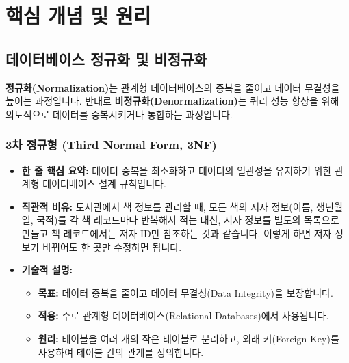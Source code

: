 \documentclass[11pt,a4paper]{article}
\begin{document}
\newpage
\section{핵심 개념 및 원리}

\subsection{데이터베이스 정규화 및 비정규화}

\begin{conceptbox}
\textbf{정규화(Normalization)}는 관계형 데이터베이스의 중복을 줄이고 데이터 무결성을 높이는 과정입니다.
반대로 \textbf{비정규화(Denormalization)}는 쿼리 성능 향상을 위해 의도적으로 데이터를 중복시키거나 통합하는 과정입니다.
\end{conceptbox}

\subsubsection{3차 정규형 (Third Normal Form, 3NF)}
\begin{itemize}
    \item \textbf{한 줄 핵심 요약:} 데이터 중복을 최소화하고 데이터의 일관성을 유지하기 위한 관계형 데이터베이스 설계 규칙입니다.
    \item \textbf{직관적 비유:} 도서관에서 책 정보를 관리할 때, 모든 책의 저자 정보(이름, 생년월일, 국적)를 각 책 레코드마다 반복해서 적는 대신, 저자 정보를 별도의 목록으로 만들고 책 레코드에서는 저자 ID만 참조하는 것과 같습니다. 이렇게 하면 저자 정보가 바뀌어도 한 곳만 수정하면 됩니다.
    \item \textbf{기술적 설명:}
    \begin{itemize}
        \item \textbf{목표:} 데이터 중복을 줄이고 데이터 무결성(Data Integrity)을 보장합니다.
        \item \textbf{적용:} 주로 관계형 데이터베이스(Relational Databases)에서 사용됩니다.
        \item \textbf{원리:} 테이블을 여러 개의 작은 테이블로 분리하고, 외래 키(Foreign Key)를 사용하여 테이블 간의 관계를 정의합니다.
    \end{itemize}
\end{itemize}
\end{document}
